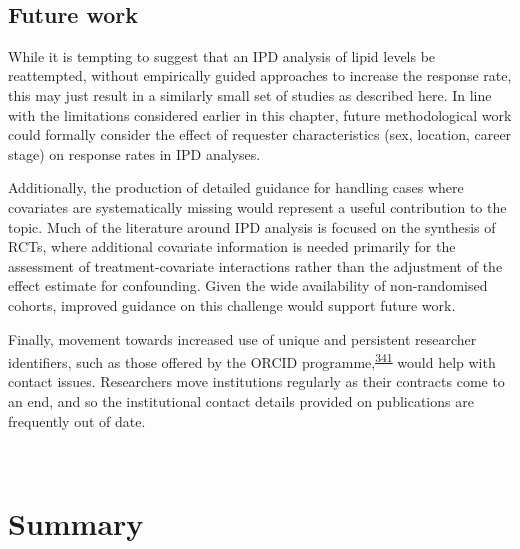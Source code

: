 \documentclass[a4paper, twoside]{templates/ociamthesis}
\begin{document}
~

\hypertarget{future-work}{%
\subsection{Future work}\label{future-work}}

While it is tempting to suggest that an IPD analysis of lipid levels be reattempted, without empirically guided approaches to increase the response rate, this may just result in a similarly small set of studies as described here. In line with the limitations considered earlier in this chapter, future methodological work could formally consider the effect of requester characteristics (sex, location, career stage) on response rates in IPD analyses.

Additionally, the production of detailed guidance for handling cases where covariates are systematically missing would represent a useful contribution to the topic. Much of the literature around IPD analysis is focused on the synthesis of RCTs, where additional covariate information is needed primarily for the assessment of treatment-covariate interactions rather than the adjustment of the effect estimate for confounding. Given the wide availability of non-randomised cohorts, improved guidance on this challenge would support future work.

Finally, movement towards increased use of unique and persistent researcher identifiers, such as those offered by the ORCID programme,\textsuperscript{\protect\hyperlink{ref-nature2009}{341}} would help with contact issues. Researchers move institutions regularly as their contracts come to an end, and so the institutional contact details provided on publications are frequently out of date.

~

\hypertarget{summary-5}{%
\section{Summary}\label{summary-5}}
\end{document}
